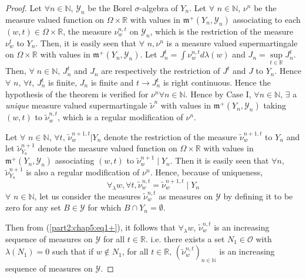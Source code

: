 \begin{proof}
Let $\forall n\in \mathbb{N}$, $\mathscr{Y}_n$ be the Borel
$\sigma$-algebra of $Y_n$. Let $\forall$ $n \in \mathbb{N}$, $\nu^n$
be the measure valued function on $\Omega\times \mathbb{R}$ with
values in $\mathfrak{m}^+ (Y_n, \mathscr{Y}_n )$ associating to each
$(w,t) \in \Omega \times \mathbb{R}$, the measure $\nu^{n,t}_w$ on
$\mathscr{Y}_n$, which is the restriction of the measure $\nu^t_w$ to
$Y_n$. Then, it is easily seen that $\forall$ $n,\nu^n$ is a measure
valued supermartingale on $\Omega \times \mathbb{R}$ with values in
$\mathfrak{m}^+ (Y_n, \mathscr{Y}_n)$. Let $J^t_n = \int\nu^{n,t}_w
d\lambda(w)$ and $J_n = \sup\limits_{t \in \mathbb{R}} J^t_n$. Then,
$\forall \; n \in \mathbb{N}$, $J^t_n$ and $J_n$ are respectively the
restriction of $J^t$ and $J$ to $Y_n$. Hence $\forall$ $n$, $\forall
t$, $J^t_n$ is finite, $J_n$ is finite and $t \to J^t_n$ is right
continuous. Hence the hypothesis of the theorem is verified for $\nu^n
\forall n \in \mathbb{N}$. Hence by Case I, $\forall n \in
\mathbb{N}$, $\exists$ a {\em unique} measure valued supermartingale
$\tilde{\nu}^n$ with values in $\mathfrak{m}^+ (Y_n, \mathscr{Y}_n)$
taking $(w,t)$ to $\tilde{\nu}^{n,t}_w$, which is a regular
modification of $\nu^n$.

Let $\forall$ $n \in \mathbb{N}$, $\forall t$, $\tilde{\nu}^{n+1,t}_w
\big| Y_n$ denote the restriction of the measure
$\tilde{\nu}^{n+1,t}_w$ to $Y_n$ and let $\tilde{\nu}^{n+1}_{Y_n}$
denote the measure valued function on $\Omega \times \mathbb{R}$ with
values in $\mathfrak{m}^+ (Y_n, \mathscr{Y}_n)$ associating $(w,t)$ to
$\tilde{\nu}^{n+1}_w \mid Y_n$. Then it is easily seen that $\forall
n$, $\tilde{\nu}^{n+1}_{Y_n}$ is also a regular modification of
$\nu^n$. Hence, because of uniqueness, 
\begin{equation*}
\forall_\lambda w, \forall t, \tilde{\nu}^{n,t}_w =
\tilde{\nu}^{n+1,t}_w \mid Y_n \tag{1}\label{part2:chap5:eq1+}
\end{equation*}
$\forall$ $n \in \mathbb{N}$, let us consider the measures
$\tilde{\nu}^{n,t}_w$ as measures on $\mathscr{Y}$ by defining it to
be zero for any set $B \in \mathscr{Y}$ for which $B \cap Y_n =
\emptyset$. 

Then from (\ref{part2:chap5:eq1+}), it follows that $\forall_\lambda w$,
$\tilde{\nu}^{n,t}_w$ is an increasing sequence of measures on
$\mathscr{Y}$ for all $t \in\mathbb{R}$. i.e. there exists a set $N_1
\in \mathscr{O}$ with $\lambda(N_1) = 0$ such that if $w \not\in N_1$,
for all $t \in\mathbb{R}$, $(\tilde{\nu}^{n,t}_w)_{n \in \mathbb{N}}$
is an increasing sequence of measures on $\mathscr{Y}$.


\end{proof}
